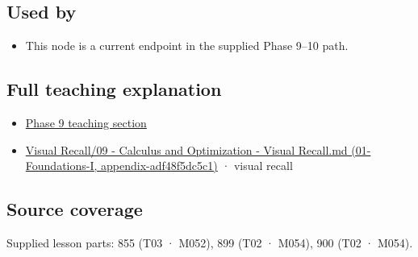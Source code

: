 \subsection{Used by}\label{appendix-8836553d56fc-used-by}

\begin{itemize}
\tightlist
\item
  This node is a current endpoint in the supplied Phase 9--10 path.
\end{itemize}

\subsection{Full teaching explanation}\label{appendix-8836553d56fc-full-teaching-explanation}

\begin{itemize}
\tightlist
\item
  \hyperref[02-foundations-ii-ch022-numerical-differentiation-and-automatic-differentiation]{Phase 9 teaching section}
\item
  \href{../01-Foundations-I/main.pdf\#nameddest=appendix-adf48f5dc5c1}{Visual Recall/09 - Calculus and Optimization - Visual Recall.md (01-Foundations-I, appendix-adf48f5dc5c1)} · visual recall
\end{itemize}

\subsection{Source coverage}\label{appendix-8836553d56fc-source-coverage}

Supplied lesson parts: 855 (T03 · M052), 899 (T02 · M054), 900 (T02 · M054).
